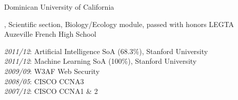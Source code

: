 \documentclass[english]{ecv}
\makeatletter
\renewcommand{\ecvBSec}[2][\ecv@lang]{%
  \ifthenelse{\equal{#1}{\ecv@lang}}{%
    \tabularnewline%
    \ecvLeft{\textsc{\Large{\textcolor{ecv@ColBlue}{#2}}} \medskip } &%
    \tabularnewline%
  }{}%
}
\makeatother
\begin{document}
\begin{ecv}
                {}
                {Dominican University of California}

                {, Scientific section, Biology/Ecology
                module, passed with honors}
                {LEGTA Auzeville French High School}

\ecvPageBreak

                {\textit{2011/12}: Artificial Intelligence SoA (68.3\%), Stanford University\\
                \textit{2011/12}: Machine Learning  SoA (100\%), Stanford University\\
                \textit{2009/09}: W3AF Web Security\\
                \textit{2008/05}: CISCO CCNA3\\
                \textit{2007/12}: CISCO CCNA1 \& 2}

             

             



\ecvBSec{\hypertarget{hypertarget:\ecvJobs}{\ecvJobs}}


\end{ecv}
\end{document}
